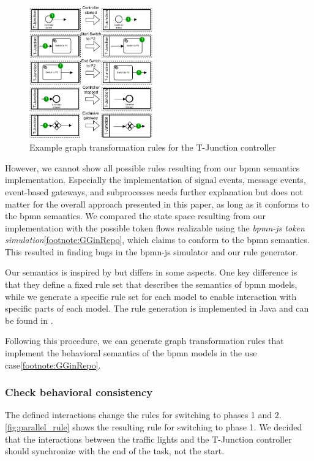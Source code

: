 \documentclass{jot}
\begin{document}
\begin{figure}[h]
    \centering
    \includegraphics[width=0.475\textwidth]{figures/bpmn_rules.pdf}
    \caption{Example graph transformation rules for the T-Junction controller}
    \label{fig:bpmn_example_rules}
\end{figure}

However, we cannot show all possible rules resulting from our \gls*{bpmn} semantics implementation.
Especially the implementation of signal events, message events, event-based gateways, and subprocesses needs further explanation but does not matter for the overall approach presented in this paper, as long as it conforms to the \gls*{bpmn} semantics.
We compared the state space resulting from our implementation with the possible token flows realizable using the \emph{bpmn-js token simulation}\cref{footnote:GGinRepo}, which claims to conform to the \gls*{bpmn} semantics.
This resulted in finding bugs in the bpmn-js simulator and our rule generator.

Our semantics is inspired by \cite{vangorpVisualTokenbasedFormalization2013} but differs in some aspects.
One key difference is that they define a fixed rule set that describes the semantics of \gls*{bpmn} models, while we generate a specific rule set for each model to enable interaction with specific parts of each model.
The rule generation is implemented in Java and can be found in \cite{krauterRewriteRuleGeneration2022}.

Following this procedure, we can generate graph transformation rules that implement the behavioral semantics of the \gls*{bpmn} models in the use case\cref{footnote:GGinRepo}.

\subsubsection{Check behavioral consistency}
The defined interactions change the rules for switching to phases 1 and 2.
\autoref{fig:parallel_rule} shows the resulting rule for switching to phase 1.
We decided that the interactions between the traffic lights and the T-Junction controller should synchronize with the end of the task, not the start.
\end{document}
